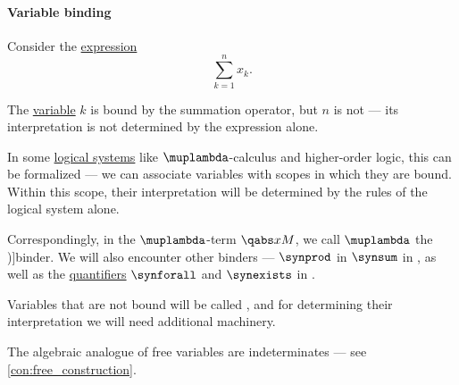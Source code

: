 \paragraph{Variable binding}

\begin{concept}\label{con:variable_binding}
  Consider the \hyperref[con:expression]{expression}
  \begin{equation*}
    \sum_{k=1}^n x_k.
  \end{equation*}

  The \hyperref[con:variable]{variable} \( k \) is bound by the summation operator, but \( n \) is not --- its interpretation is not determined by the expression alone.

  In some \hyperref[con:logical_system]{logical systems} like \( \muplambda \)-calculus and higher-order logic, this can be formalized --- we can associate variables with scopes in which they are bound. Within this scope, their interpretation will be determined by the rules of the logical system alone.

  Correspondingly, in the \( \muplambda \)-term \( \qabs x M \), we call \( \muplambda \) the \term[en=binder (\cite[23]{UnivalentFoundationsProgram2013HoTT})]{binder}. We will also encounter other binders --- \( \synprod \) in \( \synsum \) in , as well as the \hyperref[def:predicate_logic_alphabet/quantifiers]{quantifiers} \( \synforall \) and \( \synexists \) in .

  Variables that are not bound will be called , and for determining their interpretation we will need additional machinery.
\end{concept}
\begin{comments}
  \item The algebraic analogue of free variables are indeterminates --- see \cref{con:free_construction}.
\end{comments}

